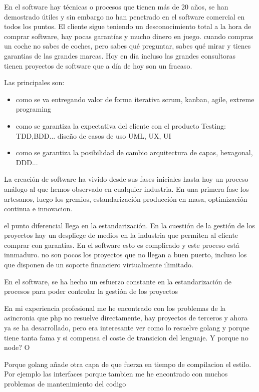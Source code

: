 En el software hay técnicas o procesos que tienen más de 20 años, se han demostrado útiles y sin embargo no han penetrado en el software comercial en todos los puntos. El cliente sigue teniendo un desconocimiento total a la hora de comprar software, hay pocas garantías y mucho dinero en juego. cuando compras un coche no sabes de coches, pero sabes qué preguntar, sabes qué mirar y tienes garantias de las grandes marcas. Hoy en día incluso las grandes consultoras tienen proyectos de software que a día de hoy son un fracaso.

Las principales son:

\begin{itemize}
	\item como se va entregando valor de forma iterativa
		\subitem  scrum, kanban, agile, extreme programing 
	\item como se garantiza la expectativa del cliente con el producto
		\subitem Testing: TDD,BDD... diseño de casos de uso UML, UX, UI
	\item como se garantiza la posibilidad de cambio
		\subitem arquitectura de capas, hexagonal, DDD... 
\end{itemize} 




La creación de software ha vivido desde sus fases iniciales hasta hoy un proceso análogo al que hemos observado en cualquier industria. En una primera fase los artesanos, luego los gremios, estandarización producción en masa, optimización continua e innovacion.


el punto diferencial llega en la estandarización. En la cuestión de la gestión de los proyectos hay un despliege de medios en la industria que permiten al cliente comprar con garantias. En el software esto es complicado y este proceso está innmaduro. no son pocos los proyectos que no llegan a buen puerto, incluso los que disponen de un soporte financiero virtualmente ilimitado.


En el software, se ha hecho un esfuerzo constante en la estandarización de procesos para poder controlar la gestión de los proyectos

 En mi experiencia profesional me he encontrado con los problemas de la asincronia que php no resuelve directamente, hay proyectos de terceros y ahora ya se ha desarrollado, pero era interesante ver como lo resuelve golang y porque tiene tanta fama y si compensa el coste de transicion del lenguaje. Y porque no node? O 

Porque golang añade otra capa de que fuerza en tiempo de compilacion el estilo. Por ejemplo las interfaces porque tambien me he encontrado con muchos problemas de mantenimiento del codigo


